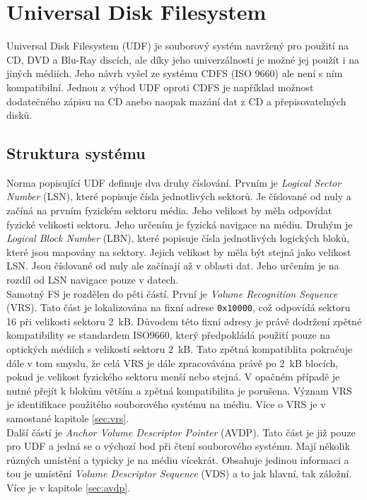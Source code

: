 \chapter{Universal Disk Filesystem}
\label{sec:udf}
Universal Disk Filesystem (UDF) je souborový systém navržený pro použití na CD, DVD a Blu-Ray discích, ale díky jeho univerzálnosti je možné jej použít i na jiných médiích. Jeho návrh vyšel ze systému CDFS (ISO 9660) ale není s ním kompatibilní. Jednou z výhod UDF oproti CDFS je například možnost dodatečného zápisu na CD anebo naopak mazání dat z CD a přepisovatelných disků.

\section{Struktura systému}
Norma popisující UDF definuje dva druhy číslování. Prvním je \textit{Logical Sector Number} (LSN), které popisuje čísla jednotlivých sektorů. Je číslované od nuly a začíná na prvním fyzickém sektoru média. Jeho velikost by měla odpovídat fyzické velikosti sektoru. Jeho určením je fyzická navigace na médiu. Druhým je \textit{Logical Block Number} (LBN), které popisuje čísla jednotlivých logických bloků, které jsou mapovány na sektory. Jejich velikost by měla být stejná jako velikost LSN. Jsou číslované od nuly ale začínají až v oblasti dat. Jeho určením je na rozdíl od LSN navigace pouze v datech.\\
Samotný FS je rozdělen do pěti částí. První je \textit{Volume Recognition Sequence} (VRS). Tato část je lokalizována na fixní adrese \texttt{0x10000}, což odpovídá sektoru 16 při velikosti sektoru 2~kB. Důvodem této fixní adresy je právě dodržení zpětné kompatibility se standardem ISO9660, který předpokládá použití pouze na optických médiích s velikostí sektoru 2~kB. Tato zpětná kompatiblita pokračuje dále v tom smyslu, že celá VRS je dále zpracovávána právě po 2~kB blocích, pokud je velikost fyzického sektoru menší nebo stejná. V opačném případě je nutné přejít k blokům větším a zpětná kompatibilita je porušena. Význam VRS je identifikace použitého souborového systému na médiu. Více o VRS je v samostané kapitole \ref{sec:vrs}.\\
Další částí je \textit{Anchor Volume Descriptor Pointer} (AVDP). Tato část je již pouze pro UDF a jedná se o výchozí bod při čtení souborového systému. Mají několik různých umístění a typicky je na médiu vícekrát. Obsahuje jedinou informaci a tou je umístění \textit{Volume Descriptor Sequence} (VDS) a to jak hlavní, tak záložní. Více je v kapitole \ref{sec:avdp}.\\
